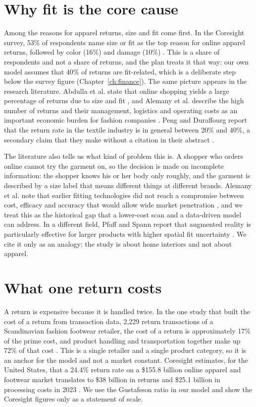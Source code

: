 \section{Why fit is the core cause}\label{sec:fit-cause}

Among the reasons for apparel returns, size and fit come first. In the Coresight survey, 53\% of respondents name size or fit as the top reason for online apparel returns, followed by color (16\%) and damage (10\%) \cite{coresight2023}. This is a share of respondents and not a share of returns, and the plan treats it that way: our own model assumes that 40\% of returns are fit-related, which is a deliberate step below the survey figure (Chapter~\ref{ch:finance}). The same picture appears in the research literature. Abdulla et al. state that online shopping yields a large percentage of returns due to size and fit \cite{abdulla2019}, and Alemany et al. describe the high number of returns and their management, logistics and operating costs as an important economic burden for fashion companies \cite{alemany2013}. Peng and Duraffourg report that the return rate in the textile industry is in general between 20\% and 40\%, a secondary claim that they make without a citation in their abstract \cite{peng2023}.

The literature also tells us what kind of problem this is. A shopper who orders online cannot try the garment on, so the decision is made on incomplete information: the shopper knows his or her body only roughly, and the garment is described by a size label that means different things at different brands. Alemany et al. note that earlier fitting technologies did not reach a compromise between cost, efficacy and accuracy that would allow wide market penetration \cite{alemany2013}, and we treat this as the historical gap that a lower-cost scan and a data-driven model can address. In a different field, Pfaff and Spann report that augmented reality is particularly effective for larger products with higher spatial fit uncertainty \cite{pfaff2025}. We cite it only as an analogy: the study is about home interiors and not about apparel.

\section{What one return costs}\label{sec:return-cost}

A return is expensive because it is handled twice. In the one study that built the cost of a return from transaction data, 2,229 return transactions of a Scandinavian fashion footwear retailer, the cost of a return is approximately 17\% of the prime cost, and product handling and transportation together make up 72\% of that cost \cite{gustafsson2021}. This is a single retailer and a single product category, so it is an anchor for the model and not a market constant. Coresight estimates, for the United States, that a 24.4\% return rate on a \$155.8 billion online apparel and footwear market translates to \$38 billion in returns and \$25.1 billion in processing costs in 2023 \cite{coresight2023}. We use the Gustafsson ratio in our model and show the Coresight figures only as a statement of scale.

